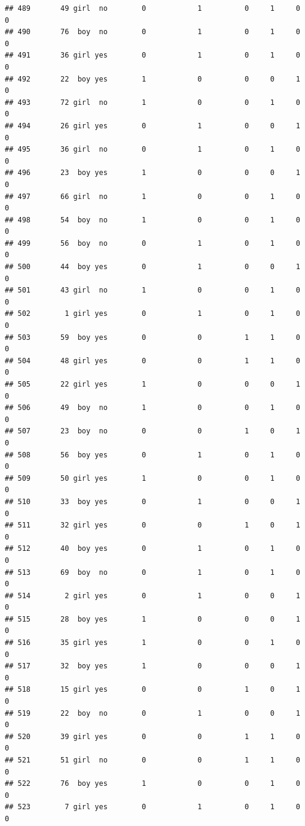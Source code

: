 \documentclass[man]{apa6}
\begin{document}
\begin{verbatim}
## 489       49 girl  no        0            1          0     1     0     0
## 490       76  boy  no        0            1          0     1     0     0
## 491       36 girl yes        0            1          0     1     0     0
## 492       22  boy yes        1            0          0     0     1     0
## 493       72 girl  no        1            0          0     1     0     0
## 494       26 girl yes        0            1          0     0     1     0
## 495       36 girl  no        0            1          0     1     0     0
## 496       23  boy yes        1            0          0     0     1     0
## 497       66 girl  no        1            0          0     1     0     0
## 498       54  boy  no        1            0          0     1     0     0
## 499       56  boy  no        0            1          0     1     0     0
## 500       44  boy yes        0            1          0     0     1     0
## 501       43 girl  no        1            0          0     1     0     0
## 502        1 girl yes        0            1          0     1     0     0
## 503       59  boy yes        0            0          1     1     0     0
## 504       48 girl yes        0            0          1     1     0     0
## 505       22 girl yes        1            0          0     0     1     0
## 506       49  boy  no        1            0          0     1     0     0
## 507       23  boy  no        0            0          1     0     1     0
## 508       56  boy yes        0            1          0     1     0     0
## 509       50 girl yes        1            0          0     1     0     0
## 510       33  boy yes        0            1          0     0     1     0
## 511       32 girl yes        0            0          1     0     1     0
## 512       40  boy yes        0            1          0     1     0     0
## 513       69  boy  no        0            1          0     1     0     0
## 514        2 girl yes        0            1          0     0     1     0
## 515       28  boy yes        1            0          0     0     1     0
## 516       35 girl yes        1            0          0     1     0     0
## 517       32  boy yes        1            0          0     0     1     0
## 518       15 girl yes        0            0          1     0     1     0
## 519       22  boy  no        0            1          0     0     1     0
## 520       39 girl yes        0            0          1     1     0     0
## 521       51 girl  no        0            0          1     1     0     0
## 522       76  boy yes        1            0          0     1     0     0
## 523        7 girl yes        0            1          0     1     0     0

\end{verbatim}
\end{document}
